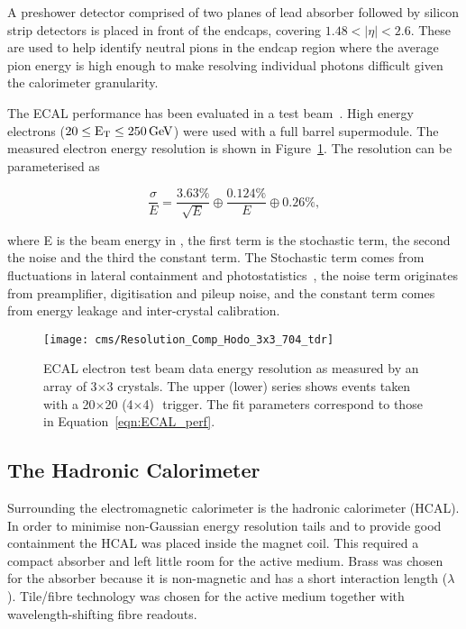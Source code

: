 A preshower detector comprised of two planes of lead absorber followed by silicon strip detectors is placed in front of the endcaps, covering $1.48 < |\eta| < 2.6$. These are used to help identify neutral pions in the endcap region where the average pion energy is high enough to make resolving individual photons difficult given the calorimeter granularity.

The ECAL performance has been evaluated in a test beam~\cite{CMS_TDR_PHYS_vol1}. High energy electrons ($20 \le \mathrm{E_{\mathrm{T}}} \le 250 \,\mathrm{Ge\hspace{-.08em}V}$) were used with a full barrel supermodule. The measured electron energy resolution is shown in Figure~\ref{fig:ECAL_perf}. The resolution can be parameterised as 

\begin{equation}
	\frac{\sigma}{E} = \frac{3.63\%}{\sqrt{E}} \oplus \frac{0.124\%}{E} \oplus 0.26\%,
\label{eqn:ECAL_perf}
\end{equation}

where E is the beam energy in \GeV, the first term is the stochastic term, the second the noise and the third the constant term. The Stochastic term comes from fluctuations in lateral containment and photostatistics~\cite{CMS_TDR_PHYS_vol1}, the noise term originates from preamplifier, digitisation and pileup noise, and the constant term comes from energy leakage and inter-crystal calibration.

\begin{figure}[tb]
  \centering
  \texttt{[image: cms/Resolution\_Comp\_Hodo\_3x3\_704\_tdr]}
  \caption{ECAL electron test beam data energy resolution as measured by an array of 3$\times$3 crystals. The upper (lower) series shows events taken with a 20$\times$20 (4$\times$4)\,~\mmsquare trigger. The fit parameters correspond to those in Equation~\ref{eqn:ECAL_perf}.~\cite{CMS_TDR_PHYS_vol1}
  \label{fig:ECAL_perf}}
\end{figure}



\subsection{The Hadronic Calorimeter}
Surrounding the electromagnetic calorimeter is the hadronic calorimeter (HCAL). In order to minimise non-Gaussian energy resolution tails and to provide good containment the HCAL was placed inside the magnet coil. This required a compact absorber and left little room for the active medium. Brass was chosen for the absorber because it is non-magnetic and has a short interaction length ($\lambda$). Tile/fibre technology was chosen for the active medium together with wavelength-shifting fibre readouts. 

